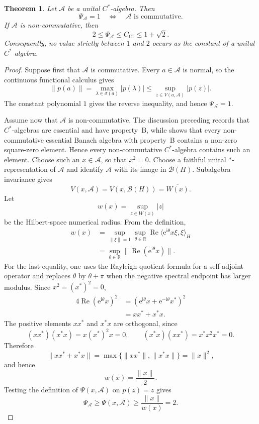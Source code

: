\documentclass[10pt,a4paper]{amsart}
\newtheorem{theorem}{Theorem}[section]
\newcommand{\calA}{\mathcal A}
\newcommand{\calB}{\mathcal B}
\begin{document}
\begin{theorem}\label{thm:cstar-gap}
Let \(\calA\) be a unital \(C^*\)-algebra.  Then
\[
       \Psi_{\calA}=1
       \quad\Longleftrightarrow\quad
       \calA\text{ is commutative}.
\]
If \(\calA\) is non-commutative, then
\[
       2\leqslant\Psi_{\calA}\leqslant C_{\mathrm{Cr}}
       \leqslant1+\sqrt2.
\]
Consequently, no value strictly between \(1\) and \(2\) occurs as the
constant of a unital \(C^*\)-algebra.
\end{theorem}

\begin{proof}
Suppose first that \(\calA\) is commutative.  Every \(a\in\calA\) is normal,
so the continuous functional calculus gives
\[
       \|p(a)\|=\max_{\lambda\in\sigma(a)}|p(\lambda)|
       \leqslant\sup_{z\in V(a,\calA)}|p(z)|.
\]
The constant polynomial \(1\) gives the reverse inequality, and hence
\(\Psi_{\calA}=1\).

Assume now that \(\calA\) is non-commutative.  The discussion preceding
\cite[Theorem~2.1]{AlaminosSquareZero} records that \(C^*\)-algebras are
essential and have property~B, while
\cite[Proposition~6.1]{AlaminosSquareZero} shows that every non-commutative
essential Banach algebra with property~B contains a non-zero square-zero
element.  Hence every non-commutative \(C^*\)-algebra contains such an
element.
Choose such an \(x\in\calA\), so that \(x^2=0\).  Choose a
faithful unital \(*\)-representation of \(\calA\) and identify \(\calA\) with
its image in \(\calB(H)\).  Subalgebra invariance gives
\[
       V(x,\calA)=V(x,\calB(H))=\overline{W(x)}.
\]
Let
\[
       w(x)=\sup_{z\in W(x)}|z|
\]
be the Hilbert-space numerical radius.  From the definition,
\[
\begin{split}
       w(x)
       &=\sup_{\|\xi\|=1}\sup_{\theta\in\mathbb R}
          \operatorname{Re}\langle
             \mathrm e^{\mathrm i\theta}x\xi,\xi\rangle_H\\
       &=\sup_{\theta\in\mathbb R}
          \bigl\|\operatorname{Re}(\mathrm e^{\mathrm i\theta}x)\bigr\|.
\end{split}
\]
For the last equality, one uses the Rayleigh-quotient formula for a
self-adjoint operator and replaces \(\theta\) by \(\theta+\pi\) when the
negative spectral endpoint has larger modulus.  Since \(x^2=(x^*)^2=0\),
\[
\begin{split}
       4\operatorname{Re}(\mathrm e^{\mathrm i\theta}x)^2
       &=(\mathrm e^{\mathrm i\theta}x+
          \mathrm e^{-\mathrm i\theta}x^*)^2\\
       &=xx^*+x^*x.
\end{split}
\]
The positive elements \(xx^*\) and \(x^*x\) are orthogonal, since
\[
       (xx^*)(x^*x)=x(x^*)^2x=0,
       \qquad
       (x^*x)(xx^*)=x^*x^2x^*=0.
\]
Therefore
\[
       \|xx^*+x^*x\|
       =\max\{\|xx^*\|,\|x^*x\|\}
       =\|x\|^2,
\]
and hence
\[
       w(x)=\frac{\|x\|}{2}.
\]
Testing the definition of \(\Psi(x,\calA)\) on \(p(z)=z\) gives
\[
       \Psi_{\calA}\geqslant\Psi(x,\calA)
       \geqslant\frac{\|x\|}{w(x)}=2.
\]


\end{proof}
\end{document}
